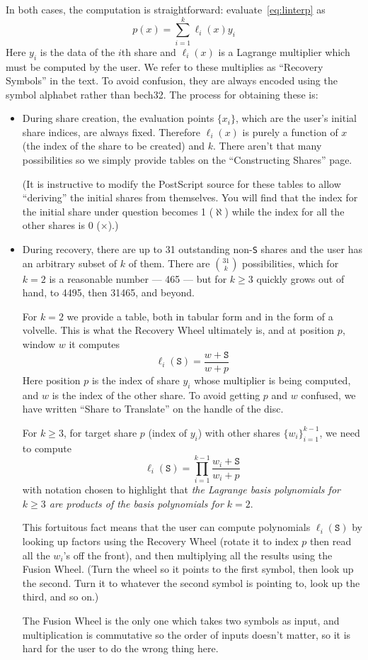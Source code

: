 \documentclass[letterpaper]{article}
\newcommand{\vc}[1]{\texttt{#1}} %
\begin{document}
In both cases, the computation is straightforward: evaluate~\eqref{eq:linterp} as
\[ p(x) = \sum_{i=1}^k \ell_i(x) y_i \]
Here $y_i$ is the data of the $i$th share and $\ell_i(x)$ is a Lagrange multiplier
which must be computed by the user. We refer to these multiplies as ``Recovery
Symbols'' in the text. To avoid confusion, they are always encoded using the symbol
alphabet rather than bech32. The process for obtaining these is:

\begin{itemize}
\item During share creation, the evaluation points $\{x_i\}$, which are the
user's initial share indices, are always fixed. Therefore $\ell_i(x)$ is purely
a function of $x$ (the index of the share to be created) and $k$. There aren't
that many possibilities so we simply provide tables on the ``Constructing Shares''
page.

(It is instructive to modify the PostScript source for these tables to allow
``deriving'' the initial shares from themselves. You will find that the index for the initial
share under question becomes 1 ($\aleph$) while the index for all the other shares
is 0 ($\times$).)

\item During recovery, there are up to 31 outstanding non-\vc{S} shares and
the user has an arbitrary subset of $k$ of them. There are $\binom{31}k$
possibilities, which for $k=2$ is a reasonable number --- 465 --- but for
$k\geq3$ quickly grows out of hand, to 4495, then 31465, and beyond.

For $k = 2$ we provide a table, both in tabular form and in the form of a volvelle.
This is what the Recovery Wheel ultimately is, and at position $p$, window $w$ it
computes
\[ \ell_i(\vc{S}) = \frac{w + \vc{S}}{w + p} \]
Here position $p$ is the index of share $y_i$ whose multiplier is being computed,
and $w$ is the index of the other share. To avoid getting $p$ and $w$ confused,
we have written ``Share to Translate'' on the handle of the disc.

For $k \geq 3$, for target share $p$ (index of $y_i$) with other shares
$\{w_i\}_{i=1}^{k-1}$, we need to compute
\[ \ell_i(\vc{S}) = \prod_{i=1}^{k-1} \frac{w_i + \vc{S}}{w_i + p} \]
with notation chosen to highlight that \emph{the Lagrange basis polynomials for
$k\geq3$ are products of the basis polynomials for $k=2$}.

This fortuitous fact means that the user can compute polynomials $\ell_i(\vc{S})$
by looking up factors using the Recovery Wheel (rotate it to index $p$ then
read all the $w_i$'s off the front), and then multiplying all the results using
the Fusion Wheel. (Turn the wheel so it points to the first symbol, then look up
the second. Turn it to whatever the second symbol is pointing to, look up the
third, and so on.)

The Fusion Wheel is the only one which takes two symbols as input, and multiplication
is commutative so the order of inputs doesn't matter, so it is hard for the user
to do the wrong thing here.
\end{itemize}
\end{document}
